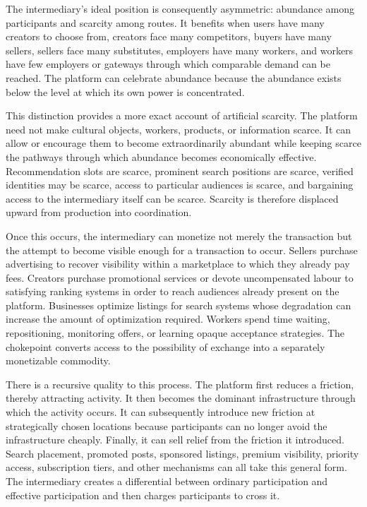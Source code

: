 \documentclass[11pt]{article}
\begin{document}
The intermediary's ideal position is consequently asymmetric: abundance among participants and scarcity among routes. It benefits when users have many creators to choose from, creators face many competitors, buyers have many sellers, sellers face many substitutes, employers have many workers, and workers have few employers or gateways through which comparable demand can be reached. The platform can celebrate abundance because the abundance exists below the level at which its own power is concentrated.

This distinction provides a more exact account of artificial scarcity. The platform need not make cultural objects, workers, products, or information scarce. It can allow or encourage them to become extraordinarily abundant while keeping scarce the pathways through which abundance becomes economically effective. Recommendation slots are scarce, prominent search positions are scarce, verified identities may be scarce, access to particular audiences is scarce, and bargaining access to the intermediary itself can be scarce. Scarcity is therefore displaced upward from production into coordination.

Once this occurs, the intermediary can monetize not merely the transaction but the attempt to become visible enough for a transaction to occur. Sellers purchase advertising to recover visibility within a marketplace to which they already pay fees. Creators purchase promotional services or devote uncompensated labour to satisfying ranking systems in order to reach audiences already present on the platform. Businesses optimize listings for search systems whose degradation can increase the amount of optimization required. Workers spend time waiting, repositioning, monitoring offers, or learning opaque acceptance strategies. The chokepoint converts access to the possibility of exchange into a separately monetizable commodity.

There is a recursive quality to this process. The platform first reduces a friction, thereby attracting activity. It then becomes the dominant infrastructure through which the activity occurs. It can subsequently introduce new friction at strategically chosen locations because participants can no longer avoid the infrastructure cheaply. Finally, it can sell relief from the friction it introduced. Search placement, promoted posts, sponsored listings, premium visibility, priority access, subscription tiers, and other mechanisms can all take this general form. The intermediary creates a differential between ordinary participation and effective participation and then charges participants to cross it.
\end{document}
